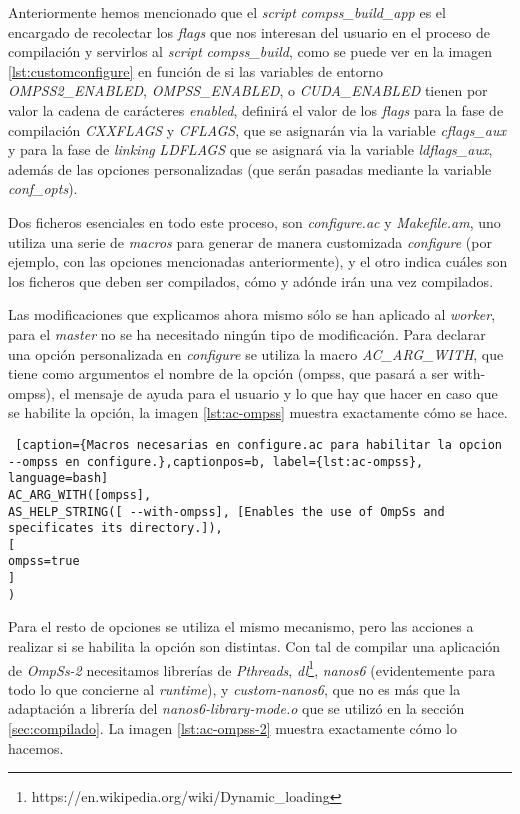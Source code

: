 Anteriormente hemos mencionado que el \textit{script} \textit{compss\_build\_app} es el encargado de recolectar los \textit{flags} que nos interesan del usuario en el proceso de compilación y servirlos al \textit{script} \textit{compss\_build}, como se puede ver en la imagen \ref{lst:customconfigure} en función de si las variables de entorno \textit{OMPSS2\_ENABLED}, \textit{OMPSS\_ENABLED}, o \textit{CUDA\_ENABLED} tienen por valor la cadena de carácteres \textit{enabled}, definirá el valor de los \textit{flags} para la fase de compilación \textit{CXXFLAGS} y \textit{CFLAGS}, que se asignarán via la variable \textit{cflags\_aux} y para la fase de \textit{linking} \textit{LDFLAGS} que se asignará via la variable \textit{ldflags\_aux}, además de las opciones personalizadas (que serán pasadas mediante la variable \textit{conf\_opts}).
\par\smallskip
Dos ficheros esenciales en todo este proceso, son \textit{configure.ac} y \textit{Makefile.am}, uno utiliza una serie de \textit{macros} para generar de manera customizada \textit{configure} (por ejemplo, con las opciones mencionadas anteriormente), y el otro indica cuáles son los ficheros que deben ser compilados, cómo y adónde irán una vez compilados.
\par\bigskip
Las modificaciones que explicamos ahora mismo sólo se han aplicado al \textit{worker}, para el \textit{master} no se ha necesitado ningún tipo de modificación. Para declarar una opción personalizada en \textit{configure} se utiliza la macro \textit{AC\_ARG\_WITH}, que tiene como argumentos el nombre de la opción (ompss, que pasará a ser with-ompss), el mensaje de ayuda para el usuario y lo que hay que hacer en caso que se habilite la opción, la imagen \ref{lst:ac-ompss} muestra exactamente cómo se hace.

\bigskip

\begin{minipage}{\linewidth}
\begin{lstlisting} [caption={Macros necesarias en configure.ac para habilitar la opcion --ompss en configure.},captionpos=b, label={lst:ac-ompss}, language=bash]
AC_ARG_WITH([ompss],
AS_HELP_STRING([ --with-ompss], [Enables the use of OmpSs and 
specificates its directory.]),
[
ompss=true
]
)
\end{lstlisting}
\end{minipage}

\par\bigskip

Para el resto de opciones se utiliza el mismo mecanismo, pero las acciones a realizar si se habilita la opción son distintas. Con tal de compilar una aplicación de \textit{OmpSs-2} necesitamos librerías de \textit{Pthreads}, \textit{dl}\footnote{https://en.wikipedia.org/wiki/Dynamic\_loading}, \textit{nanos6} (evidentemente para todo lo que concierne al \textit{runtime}), y \textit{custom-nanos6}, que no es más que la adaptación a librería del \textit{nanos6-library-mode.o} que se utilizó en la sección \ref{sec:compilado}. La imagen \ref{lst:ac-ompss-2} muestra exactamente cómo lo hacemos.

